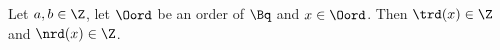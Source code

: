 Let $a,b\in\Z$, let $\Oord$ be an order of $\Bq$ and $x\in\Oord$. Then $\trd(x)\in\Z$ and $\nrd(x)\in\Z$.
